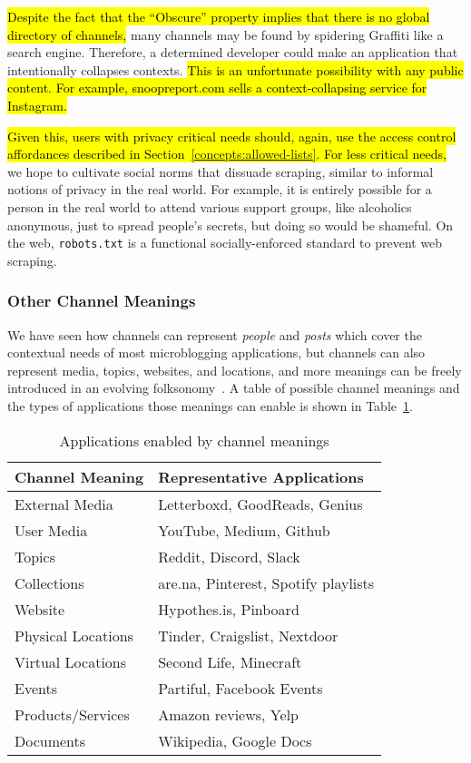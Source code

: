 \hl{%
Despite the fact that the ``Obscure'' property implies that
there is no global directory of channels,
}%
many channels may be found by spidering Graffiti like a search engine.
Therefore, a determined
developer could make an application that intentionally collapses contexts.
\hl{%
This is an unfortunate possibility with any public content.
For example, snoopreport.com sells a context-collapsing service for Instagram.
}%

\hl{%
Given this, users with privacy critical needs should, again, use the
access control affordances described in Section~{\ref{concepts:allowed-lists}}.
For less critical needs,
}%
we hope to cultivate social norms that dissuade scraping, similar to informal notions of privacy in the real world.
For example, it is entirely possible for a person in the real world
to attend various support groups, like alcoholics anonymous,
just to spread people's secrets, but doing so would be shameful.
On the web, \texttt{robots.txt} is a functional socially-enforced standard
to prevent web scraping.


\subsubsection{Other Channel Meanings}

We have seen how channels can represent \emph{people} and \emph{posts}
which cover the contextual needs of most microblogging applications,
but channels can also represent media, topics, websites, and locations,
and more meanings can be freely introduced in an evolving folksonomy~\cite{folksonomy}.
A table of possible channel meanings and the types of applications
those meanings can enable is shown in Table~\ref{concepts:channels-and-applications}.

\begin{table}[h]
\small
\caption{Applications enabled by channel meanings}
\label{concepts:channels-and-applications}
\centering
\begin{tabular}{|l|l|}
\hline
\textbf{Channel Meaning} & \textbf{Representative Applications} \\ \hline
External Media & Letterboxd, GoodReads, Genius \\ \hline
User Media & YouTube, Medium, Github \\ \hline
Topics & Reddit, Discord, Slack \\ \hline
Collections & are.na, Pinterest, Spotify playlists \\ \hline
Website & Hypothes.is, Pinboard \\ \hline
Physical Locations & Tinder, Craigslist, Nextdoor \\ \hline
Virtual Locations & Second Life, Minecraft \\ \hline
Events & Partiful, Facebook Events \\ \hline
Products/Services & Amazon reviews, Yelp \\ \hline
Documents & Wikipedia, Google Docs \\ \hline
\end{tabular}
\end{table}

